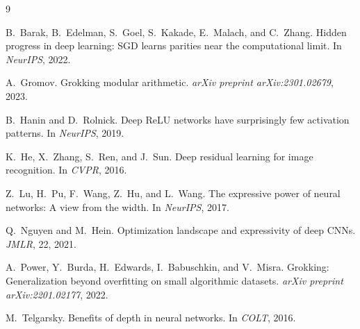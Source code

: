 \documentclass[11pt,a4paper]{article}
\begin{document}

\begin{thebibliography}{9}

B.~Barak, B.~Edelman, S.~Goel, S.~Kakade, E.~Malach, and C.~Zhang.
\newblock Hidden progress in deep learning: SGD learns parities near the computational limit.
\newblock In \emph{NeurIPS}, 2022.

A.~Gromov.
\newblock Grokking modular arithmetic.
\newblock \emph{arXiv preprint arXiv:2301.02679}, 2023.

B.~Hanin and D.~Rolnick.
\newblock Deep ReLU networks have surprisingly few activation patterns.
\newblock In \emph{NeurIPS}, 2019.

K.~He, X.~Zhang, S.~Ren, and J.~Sun.
\newblock Deep residual learning for image recognition.
\newblock In \emph{CVPR}, 2016.

Z.~Lu, H.~Pu, F.~Wang, Z.~Hu, and L.~Wang.
\newblock The expressive power of neural networks: A view from the width.
\newblock In \emph{NeurIPS}, 2017.

Q.~Nguyen and M.~Hein.
\newblock Optimization landscape and expressivity of deep {CNNs}.
\newblock \emph{JMLR}, 22, 2021.

A.~Power, Y.~Burda, H.~Edwards, I.~Babuschkin, and V.~Misra.
\newblock Grokking: Generalization beyond overfitting on small algorithmic datasets.
\newblock \emph{arXiv preprint arXiv:2201.02177}, 2022.

M.~Telgarsky.
\newblock Benefits of depth in neural networks.
\newblock In \emph{COLT}, 2016.

\end{thebibliography}
\end{document}

